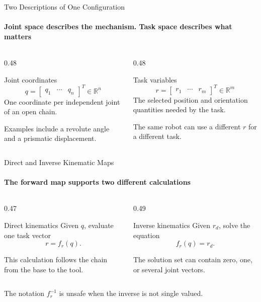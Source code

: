 \documentclass[aspectratio=169]{beamer}
\begin{document}
\begin{frame}[t]{Two Descriptions of One Configuration}
    \framesubtitle{Joint space describes the mechanism. Task space describes what matters}
    \begin{columns}[T,onlytextwidth]
        \begin{column}{0.48\textwidth}
            \begin{block}{Joint coordinates}
                \[
                    q=\begin{bmatrix}q_1&\cdots&q_n\end{bmatrix}^{T}
                    \in\mathbb{R}^{n}
                \]
                One coordinate per independent joint of an open chain.

                \medskip
                Examples include a revolute angle and a prismatic displacement.
            \end{block}
        \end{column}
        \begin{column}{0.48\textwidth}
            \begin{block}{Task variables}
                \[
                    r=\begin{bmatrix}r_1&\cdots&r_m\end{bmatrix}^{T}
                    \in\mathbb{R}^{m}
                \]
                The selected position and orientation quantities needed by the task.

                \medskip
                The same robot can use a different $r$ for a different task.
            \end{block}
        \end{column}
    \end{columns}
\end{frame}

\begin{frame}[t]{Direct and Inverse Kinematic Maps}
    \framesubtitle{The forward map supports two different calculations}
    \begin{columns}[T,onlytextwidth]
        \begin{column}{0.47\textwidth}
            \begin{block}{Direct kinematics}
                Given $q$, evaluate one task vector
                \[
                    r=f_r(q).
                \]
            \end{block}
            This calculation follows the chain from the base to the tool.
        \end{column}
        \begin{column}{0.49\textwidth}
            \begin{block}{Inverse kinematics}
                Given $r_d$, solve the equation
                \[
                    f_r(q)=r_d.
                \]
            \end{block}
            The solution set can contain zero, one, or several joint vectors.
        \end{column}
    \end{columns}
    \bigskip
    \centering
    \alert{The notation $f_r^{-1}$ is unsafe when the inverse is not single valued.}
\end{frame}
\end{document}
